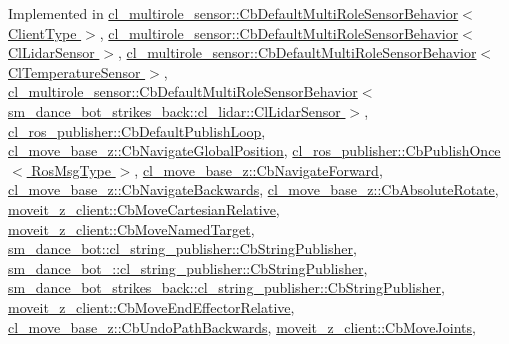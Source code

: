Implemented in \hyperlink{classcl__multirole__sensor_1_1CbDefaultMultiRoleSensorBehavior_a0f400c7e29d0cb1dda11242a5a922f4c}{cl\+\_\+multirole\+\_\+sensor\+::\+Cb\+Default\+Multi\+Role\+Sensor\+Behavior$<$ Client\+Type $>$}, \hyperlink{classcl__multirole__sensor_1_1CbDefaultMultiRoleSensorBehavior_a0f400c7e29d0cb1dda11242a5a922f4c}{cl\+\_\+multirole\+\_\+sensor\+::\+Cb\+Default\+Multi\+Role\+Sensor\+Behavior$<$ Cl\+Lidar\+Sensor $>$}, \hyperlink{classcl__multirole__sensor_1_1CbDefaultMultiRoleSensorBehavior_a0f400c7e29d0cb1dda11242a5a922f4c}{cl\+\_\+multirole\+\_\+sensor\+::\+Cb\+Default\+Multi\+Role\+Sensor\+Behavior$<$ Cl\+Temperature\+Sensor $>$}, \hyperlink{classcl__multirole__sensor_1_1CbDefaultMultiRoleSensorBehavior_a0f400c7e29d0cb1dda11242a5a922f4c}{cl\+\_\+multirole\+\_\+sensor\+::\+Cb\+Default\+Multi\+Role\+Sensor\+Behavior$<$ sm\+\_\+dance\+\_\+bot\+\_\+strikes\+\_\+back\+::cl\+\_\+lidar\+::\+Cl\+Lidar\+Sensor $>$}, \hyperlink{classcl__ros__publisher_1_1CbDefaultPublishLoop_a206c6bc09e7c6414304b679ec415c19f}{cl\+\_\+ros\+\_\+publisher\+::\+Cb\+Default\+Publish\+Loop}, \hyperlink{classcl__move__base__z_1_1CbNavigateGlobalPosition_a5c18268af1e7fc236aa155a58345d5d7}{cl\+\_\+move\+\_\+base\+\_\+z\+::\+Cb\+Navigate\+Global\+Position}, \hyperlink{classcl__ros__publisher_1_1CbPublishOnce_ad82cb7d6ac69fe9b91bc955550ab92cb}{cl\+\_\+ros\+\_\+publisher\+::\+Cb\+Publish\+Once$<$ Ros\+Msg\+Type $>$}, \hyperlink{classcl__move__base__z_1_1CbNavigateForward_a2160484562ef5fb1c655fab7f990241e}{cl\+\_\+move\+\_\+base\+\_\+z\+::\+Cb\+Navigate\+Forward}, \hyperlink{classcl__move__base__z_1_1CbNavigateBackwards_a92858e20e6401051203f5dfa4aef60dc}{cl\+\_\+move\+\_\+base\+\_\+z\+::\+Cb\+Navigate\+Backwards}, \hyperlink{classcl__move__base__z_1_1CbAbsoluteRotate_a0e362b8e9f0d7de5aeee183ba4031437}{cl\+\_\+move\+\_\+base\+\_\+z\+::\+Cb\+Absolute\+Rotate}, \hyperlink{classmoveit__z__client_1_1CbMoveCartesianRelative_a539af37d16cffdc51127c7a5206504cb}{moveit\+\_\+z\+\_\+client\+::\+Cb\+Move\+Cartesian\+Relative}, \hyperlink{classmoveit__z__client_1_1CbMoveNamedTarget_ab91985b232e1185b4b102bb309f65ffc}{moveit\+\_\+z\+\_\+client\+::\+Cb\+Move\+Named\+Target}, \hyperlink{classsm__dance__bot_1_1cl__string__publisher_1_1CbStringPublisher_ac93cc1eb150140331cb3e560ec8249e2}{sm\+\_\+dance\+\_\+bot\+::cl\+\_\+string\+\_\+publisher\+::\+Cb\+String\+Publisher}, \hyperlink{classsm__dance__bot__2_1_1cl__string__publisher_1_1CbStringPublisher_aee990acdb5ec33f1d22efafbe32216f2}{sm\+\_\+dance\+\_\+bot\+\_\+::cl\+\_\+string\+\_\+publisher\+::\+Cb\+String\+Publisher}, \hyperlink{classsm__dance__bot__strikes__back_1_1cl__string__publisher_1_1CbStringPublisher_ae4aa02553119822c583bb2abb44c810c}{sm\+\_\+dance\+\_\+bot\+\_\+strikes\+\_\+back\+::cl\+\_\+string\+\_\+publisher\+::\+Cb\+String\+Publisher}, \hyperlink{classmoveit__z__client_1_1CbMoveEndEffectorRelative_af23c69f0919a2f62fbddf0e1dbdb83e1}{moveit\+\_\+z\+\_\+client\+::\+Cb\+Move\+End\+Effector\+Relative}, \hyperlink{classcl__move__base__z_1_1CbUndoPathBackwards_a20cee921ad92db16f8d17c3c3b9c2daf}{cl\+\_\+move\+\_\+base\+\_\+z\+::\+Cb\+Undo\+Path\+Backwards}, \hyperlink{classmoveit__z__client_1_1CbMoveJoints_a104abb9c8f8ebb04a6e5c8e84b473add}{moveit\+\_\+z\+\_\+client\+::\+Cb\+Move\+Joints}, 